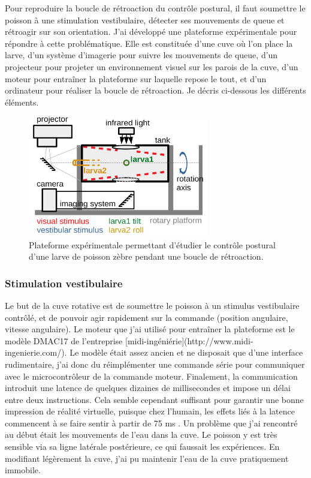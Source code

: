 Pour reproduire la boucle de rétroaction du contrôle postural, il faut soumettre le poisson à une stimulation vestibulaire, détecter ses mouvements de queue et rétroagir sur son orientation. J'ai développé une plateforme expérimentale pour répondre à cette problématique. Elle est constituée d'une cuve où l'on place la larve, d'un système d'imagerie pour suivre les mouvements de queue, d'un projecteur pour projeter un environnement visuel sur les parois de la cuve, d'un moteur pour entraîner la plateforme sur laquelle repose le tout, et d'un ordinateur pour réaliser la boucle de rétroaction. Je décris ci-dessous les différents éléments.

\begin{figure}
\centering
\includegraphics[width=0.7\textwidth]{./files/schema_manip.png}
\caption{Plateforme expérimentale permettant d'étudier le contrôle postural d'une larve de poisson zèbre pendant une boucle de rétroaction.}
\end{figure}

\subsubsection{Stimulation vestibulaire}
Le but de la cuve rotative est de soumettre le poisson à un stimulus vestibulaire contrôlé, et de pouvoir agir rapidement sur la commande (position angulaire, vitesse angulaire). Le moteur que j'ai utilisé pour entraîner la plateforme est le modèle DMAC17 de l'entreprise [midi-ingéniérie](http://www.midi-ingenierie.com/). Le modèle était assez ancien et ne disposait que d'une interface rudimentaire, j'ai donc du réimplémenter une commande série pour communiquer avec le microcontrôleur de la commande moteur. Finalement, la communication introduit une latence de quelques dizaines de millisecondes et impose un délai entre deux instructions. Cela semble cependant suffisant pour garantir une bonne impression de réalité virtuelle, puisque chez l'humain, les effets liés à la latence commencent à se faire sentir à partir de 75 ms \cite{waltemate_impact_2016}. Un problème que j'ai rencontré au début était les mouvements de l'eau dans la cuve. Le poisson y est très sensible via sa ligne latérale postérieure, ce qui faussait les expériences. En modifiant légèrement la cuve, j'ai pu maintenir l'eau de la cuve pratiquement immobile.


